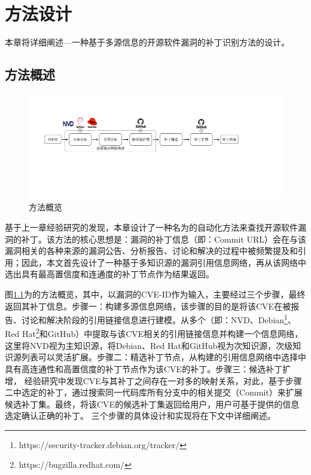 
\chapter{\tool 方法设计}

本章将详细阐述\tool ---一种基于多源信息的开源软件漏洞的补丁识别方法的设计。

\section{方法概述}
\begin{figure}[h]
    \centering
    \includegraphics[scale=0.40]{res/overview.pdf}
    \caption{\tool 方法概览}\label{fig:overview}
\end{figure}

基于上一章经验研究的发现，本章设计了一种名为\tool 的自动化方法来查找开源软件漏洞的补丁。该方法的核心思想是：漏洞的补丁信息（即：Commit URL）会在与该漏洞相关的各种来源的漏洞公告、分析报告、讨论和解决的过程中被频繁提及和引用；因此，本文首先设计了一种基于多知识源的漏洞引用信息网络，再从该网络中选出具有最高置信度和连通度的补丁节点作为结果返回。

图\ref{fig:overview}为\tool 的方法概览，其中，\tool 以漏洞的CVE-ID作为输入，主要经过三个步骤，最终返回其补丁信息。步骤一：构建多源信息网络，该步骤的目的是将该CVE在被报告、讨论和解决阶段的引用链接信息进行建模。\tool 从多个（即：NVD、Debian\footnote{https://security-tracker.debian.org/tracker/}、Red Hat\footnote{https://bugzilla.redhat.com/}和GitHub）中提取与该CVE相关的引用链接信息并构建一个信息网络，这里将NVD视为主知识源，将Debian、Red Hat和GitHub视为次知识源，次级知识源列表可以灵活扩展。步骤二：精选补丁节点，\tool 从构建的引用信息网络中选择中具有高连通性和高置信度的补丁节点作为该CVE的补丁。步骤三：候选补丁扩增， 经验研究中发现CVE与其补丁之间存在一对多的映射关系，对此，基于步骤二中选定的补丁，\tool 通过搜索同一代码库所有分支中的相关提交（Commit）来扩展候选补丁集。最终，\tool 将该CVE的候选补丁集返回给用户，用户可基于\tool 提供的信息选定确认正确的补丁。%
三个步骤的具体设计和实现将在下文中详细阐述。

